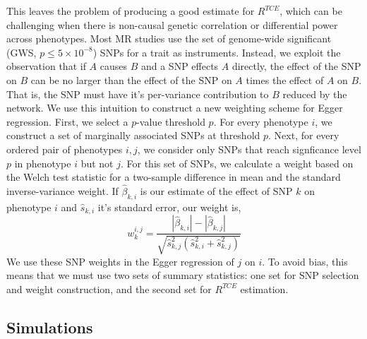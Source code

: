 \documentclass{article}
\begin{document}
This leaves the problem of producing a good estimate for $R^{TCE}$,
which can be challenging when there is non-causal genetic correlation or
differential power across phenotypes. Most MR studies use the set of
genome-wide significant (GWS, $p \le 5\times 10^{-8}$) SNPs for a trait as instruments.
Instead, we exploit the observation that if $A$ causes $B$ and a SNP effects $A$ directly,
the effect of the SNP on $B$ can be no larger than the effect of the SNP on $A$ times
the effect of $A$ on $B$. That is, the SNP must have it's per-variance contribution to
$B$ reduced by the network. We use this intuition to construct a new
weighting scheme for Egger regression.
First, we select a $p$-value threshold $p$. For every phenotype $i$, we
 construct a set of marginally associated SNPs at threshold $p$. Next,
 for every ordered pair of phenotypes $i, j$, we consider only SNPs that reach
 signficance level $p$ in phenotype $i$ but not $j$. For this set of SNPs, we calculate
 a weight based on the Welch test statistic for a two-sample difference in mean
 and the standard inverse-variance weight. If $\hat{\beta}_{k, i}$ is our estimate
 of the effect of SNP $k$ on phenotype $i$ and $\hat{s}_{k, i}$ it's standard error,
 our weight is,
\begin{equation}
w^{i,j}_k = \frac{|\hat{\beta}_{k, i}| - |\hat{\beta}_{k, j}|}
  {\sqrt{\hat{s}_{k,j}^2 (\hat{s}^2_{k, i} + \hat{s}^2_{k, j})}}
\end{equation}
We use these SNP weights in the Egger regression of $j$ on $i$.
To avoid bias, this means that we must use two sets of summary
statistics: one set for SNP selection and weight construction,
 and the second set for $R^{TCE}$ estimation.


\subsection{Simulations}
\end{document}

